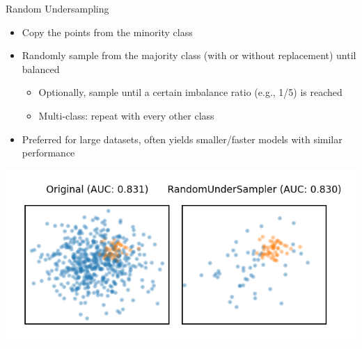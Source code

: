 \begin{frame}{Random Undersampling}
\begin{itemize}
    \item Copy the points from the minority class
    \item Randomly sample from the majority class (with or without replacement) until balanced
    \begin{itemize}
        \item Optionally, sample until a certain imbalance ratio (e.g., 1/5) is reached
        \item Multi-class: repeat with every other class
    \end{itemize}
    \item Preferred for large datasets, often yields smaller/faster models with similar performance
\end{itemize}

\begin{center}
    \includegraphics[width=0.75\linewidth]{images/pre-processing/random-undersampling.png}
\end{center}
\end{frame}


